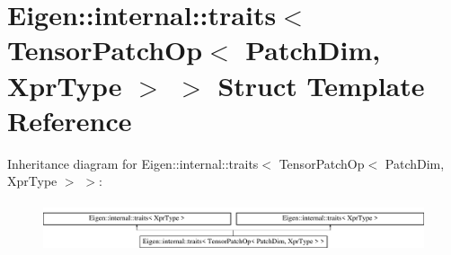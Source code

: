 \hypertarget{struct_eigen_1_1internal_1_1traits_3_01_tensor_patch_op_3_01_patch_dim_00_01_xpr_type_01_4_01_4}{}\section{Eigen\+:\+:internal\+:\+:traits$<$ Tensor\+Patch\+Op$<$ Patch\+Dim, Xpr\+Type $>$ $>$ Struct Template Reference}
\label{struct_eigen_1_1internal_1_1traits_3_01_tensor_patch_op_3_01_patch_dim_00_01_xpr_type_01_4_01_4}
Inheritance diagram for Eigen\+:\+:internal\+:\+:traits$<$ Tensor\+Patch\+Op$<$ Patch\+Dim, Xpr\+Type $>$ $>$\+:\begin{figure}[H]
\begin{center}
\leavevmode
\includegraphics[height=1.473684cm]{struct_eigen_1_1internal_1_1traits_3_01_tensor_patch_op_3_01_patch_dim_00_01_xpr_type_01_4_01_4}
\end{center}
\end{figure}
